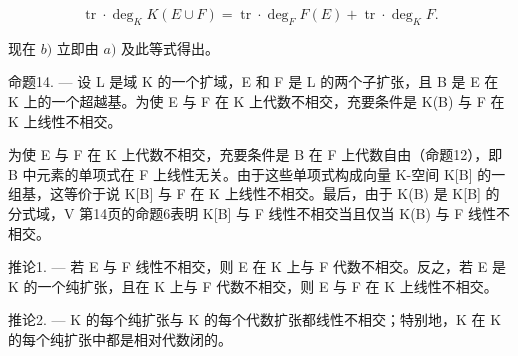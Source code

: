 \[
\operatorname{tr} \cdot \deg_ {K} K (E \cup F) = \operatorname{tr} \cdot \deg_ {F} F (E) + \operatorname{tr} \cdot \deg_ {K} F.
\]

现在 \(b)\) 立即由 \(a)\) 及此等式得出。

命题14. --- 设 L 是域 K 的一个扩域，E 和 F 是 L 的两个子扩张，且 B 是 E 在 K 上的一个超越基。为使 E 与 F 在 K 上代数不相交，充要条件是 K(B) 与 F 在 K 上线性不相交。

为使 E 与 F 在 K 上代数不相交，充要条件是 B 在 F 上代数自由（命题12），即 B 中元素的单项式在 F 上线性无关。由于这些单项式构成向量 K-空间 K{[}B{]} 的一组基，这等价于说 K{[}B{]} 与 F 在 K 上线性不相交。最后，由于 K(B) 是 K{[}B{]} 的分式域，V 第14页的命题6表明 K{[}B{]} 与 F 线性不相交当且仅当 K(B) 与 F 线性不相交。

推论1. --- 若 E 与 F 线性不相交，则 E 在 K 上与 F 代数不相交。反之，若 E 是 K 的一个纯扩张，且在 K 上与 F 代数不相交，则 E 与 F 在 K 上线性不相交。

推论2. --- K 的每个纯扩张与 K 的每个代数扩张都线性不相交；特别地，K 在 K 的每个纯扩张中都是相对代数闭的。

